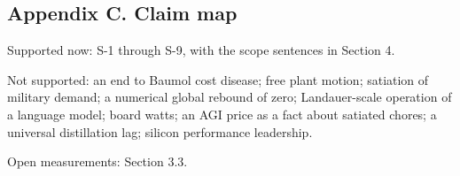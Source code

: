 \documentclass[
  10pt,
]{article}
\begin{document}
\subsection{Appendix C. Claim map}\label{appendix-c.-claim-map}

Supported now: S-1 through S-9, with the scope sentences in Section 4.

Not supported: an end to Baumol cost disease; free plant motion;
satiation of military demand; a numerical global rebound of zero;
Landauer-scale operation of a language model; board watts; an AGI price
as a fact about satiated chores; a universal distillation lag; silicon
performance leadership.

Open measurements: Section 3.3.
\end{document}

